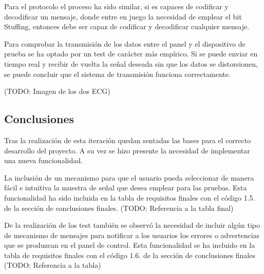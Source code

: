         Para el protocolo el proceso ha sido similar, si es capaces de codificar y decodificar un mensaje, donde entre en juego la necesidad de emplear el bit Stuffing, entonces debe ser capaz de codificar y decodificar cualquier mensaje.

        Para comprobar la transmisión de los datos entre el panel y el dispositivo de prueba se ha optado por un test de carácter más empírico. Si se puede enviar en tiempo real y recibir de vuelta la señal deseada sin que los datos se distorsionen, se puede concluir que el sistema de transmisión funciona correctamente.

        (TODO: Imagen de los dos ECG)


    \subsection{Conclusiones}

        Tras la realización de esta iteración quedan sentadas las bases para el correcto desarrollo del proyecto. A su vez se hizo presente la necesidad de implementar una nueva funcionalidad.

        La inclusión de un mecanismo para que el usuario pueda seleccionar de manera fácil e intuitiva la muestra de señal que desea emplear para las pruebas. Esta funcionalidad ha sido incluida en la tabla de requisitos finales con el código 1.5. de la sección de conclusiones finales. (TODO: Referencia a la tabla final)

        De la realización de los test también se observó la necesidad de incluir algún tipo de mecanismo de mensajes para notificar a los usuarios los errores o advertencias que se produzcan en el panel de control. Esta funcionalidad se ha incluido en la tabla de requisitos finales con el código 1.6. de la sección de conclusiones finales (TODO: Referencia a la tabla)
        